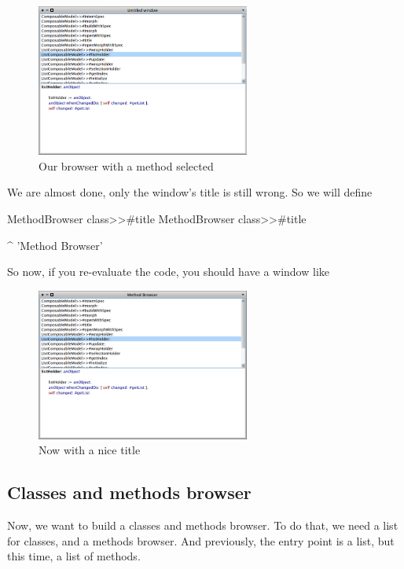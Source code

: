 \documentclass[a4paper,10pt,twoside]{book}
\begin{document}
\begin{figure}[ht]
\begin{center}
	\includegraphics[width=7cm]{MethodBrowser3}
	\caption{Our browser with a method selected}
\end{center}
\end{figure}

We are almost done, only the window's title is still wrong.
So we will define
\begin{method}{MethodBrowser class>>\#title}
MethodBrowser class>>#title

	^ 'Method Browser'
\end{method}

So now, if you re-evaluate the code, you should have a window like 

\begin{figure}[ht]
\begin{center}
	\includegraphics[width=7cm]{MethodBrowser4}
	\caption{Now with a nice title}
\end{center}
\end{figure}

\subsection{Classes and methods browser}

Now, we want to build a classes and methods browser. To do that, we need a list for classes, and a methods browser. And previously, the entry point is a list, but this time, a list of methods.
\end{document}
